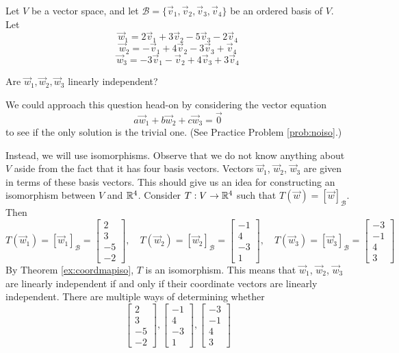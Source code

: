 \documentclass{ximera}
\begin{document}
\begin{example}\label{ex:inverseimageoflinind}
Let $V$ be a vector space, and let $\mathcal{B}=\{\vec{v}_1, \vec{v}_2, \vec{v}_3, \vec{v}_4\}$ be an ordered basis of $V$.  Let 
$$\vec{w}_1=2\vec{v}_1+3\vec{v}_2-5\vec{v}_3-2\vec{v}_4$$
$$\vec{w}_2=-\vec{v}_1+4\vec{v}_2-3\vec{v}_3+\vec{v}_4$$
$$\vec{w}_3=-3\vec{v}_1-\vec{v}_2+4\vec{v}_3+3\vec{v}_4$$

Are $\vec{w}_1, \vec{w}_2, \vec{w}_3$ linearly independent?
\begin{explanation}
We could approach this question head-on by considering the vector equation
$$a\vec{w}_1+b\vec{w}_2+c\vec{w}_3=\vec{0}$$
to see if the only solution is the trivial one. (See Practice Problem \ref{prob:noiso}.)

Instead, we will use isomorphisms.  Observe that we do not know anything about $V$ aside from the fact that it has four basis vectors.  Vectors $\vec{w}_1$, $\vec{w}_2$, $\vec{w}_3$ are given in terms of these basis vectors.  This should give us an idea for constructing an isomorphism between $V$ and $\mathbb{R}^4$.  Consider $T:V\rightarrow\mathbb{R}^4$ such that $T(\vec{w})=[\vec{w}]_{\mathcal{B}}$.
Then $$T(\vec{w}_1)=[\vec{w}_1]_{\mathcal{B}}=\begin{bmatrix}2\\3\\-5\\-2\end{bmatrix},\quad T(\vec{w}_2)=[\vec{w}_2]_{\mathcal{B}}=\begin{bmatrix}-1\\4\\-3\\1\end{bmatrix},\quad T(\vec{w}_3)=[\vec{w}_3]_{\mathcal{B}}=\begin{bmatrix}-3\\-1\\4\\3\end{bmatrix}$$
By Theorem \ref{ex:coordmapiso}, $T$   is an isomorphism.  This means that $\vec{w}_1$, $\vec{w}_2$, $\vec{w}_3$ are linearly independent if and only if their coordinate vectors are linearly independent.  There are multiple ways of determining whether 
$$\begin{bmatrix}2\\3\\-5\\-2\end{bmatrix}, \begin{bmatrix}-1\\4\\-3\\1\end{bmatrix}, \begin{bmatrix}-3\\-1\\4\\3\end{bmatrix}$$

\end{explanation}
\end{example}
\end{document}

